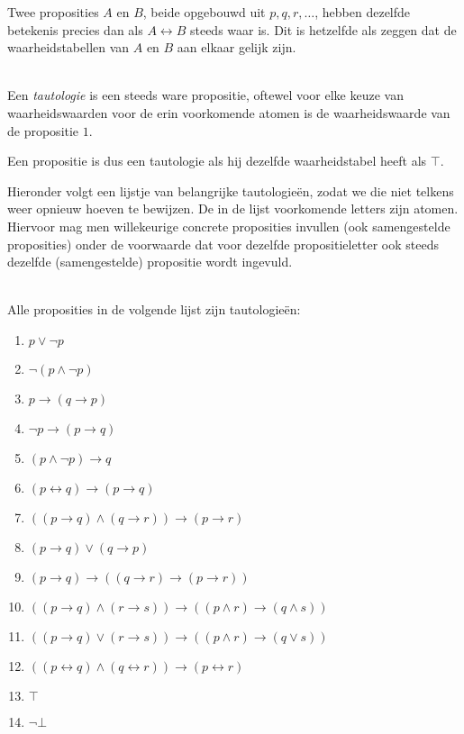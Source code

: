 Twee proposities $A$ en $B$, beide opgebouwd uit $p, q, r,\ldots$, hebben dezelfde betekenis precies dan als $A\leftrightarrow B$ steeds waar is. Dit is hetzelfde als zeggen dat de waarheidstabellen van $A$ en $B$ aan elkaar gelijk zijn.

\begin{definition}[Tautologie]\mbox{}\\
Een \textit{tautologie} is een steeds ware propositie, oftewel voor elke keuze van waarheidswaarden voor de erin voorkomende atomen is de waarheidswaarde van de propositie $1$.
\end{definition}
%
Een propositie is dus een tautologie als hij dezelfde waarheidstabel heeft als $\top$.

Hieronder volgt een lijstje van belangrijke tautologie\"en, zodat we die niet telkens weer opnieuw hoeven te bewijzen. De in de lijst voorkomende letters zijn atomen. Hiervoor mag men willekeurige concrete proposities invullen (ook samengestelde proposities) onder de voorwaarde dat voor dezelfde propositieletter ook steeds dezelfde (samengestelde) propositie wordt ingevuld.

\begin{theorem}\mbox{}\\
Alle proposities in de volgende lijst zijn tautologie\"en:
\begin{enumerate}
\item $p\lor\neg p$
\item $\neg(p\land\neg p)$
\item $p\rightarrow(q\rightarrow p)$
\item $\neg p\rightarrow(p\rightarrow q)$
\item $(p\land\neg p)\rightarrow q$
\item $(p\leftrightarrow q)\rightarrow(p\rightarrow q)$
\item $((p\rightarrow q)\land(q\rightarrow r))\rightarrow(p\rightarrow r)$
\item $(p\rightarrow q)\lor(q\rightarrow p)$
\item $(p\rightarrow q)\rightarrow((q\rightarrow r)\rightarrow(p\rightarrow r))$
\item $((p\rightarrow q)\land(r\rightarrow s))\rightarrow((p\land r)\rightarrow(q\land s))$
\item $((p\rightarrow q)\lor(r\rightarrow s))\rightarrow((p\land r)\rightarrow(q\lor s))$
\item $((p\leftrightarrow q)\land(q\leftrightarrow r))\rightarrow(p\leftrightarrow r)$
\item $\top$
\item $\neg\bot$
\end{enumerate}
\end{theorem}


